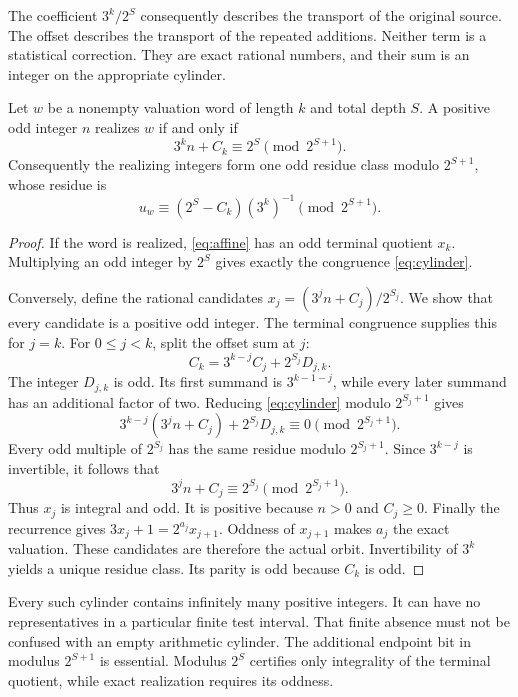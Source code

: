 The coefficient $3^k/2^S$ consequently describes the transport of the original source. The offset describes the transport of the repeated additions. Neither term is a statistical correction. They are exact rational numbers, and their sum is an integer on the appropriate cylinder.

\begin{theorem}\label{thm:cylinder}
Let $w$ be a nonempty valuation word of length $k$ and total depth $S$. A positive odd integer $n$ realizes $w$ if and only if
\begin{equation}\label{eq:cylinder}
3^k n+C_k\equiv 2^S\pmod{2^{S+1}}.
\end{equation}
Consequently the realizing integers form one odd residue class modulo $2^{S+1}$, whose residue is
\begin{equation}\label{eq:address}
u_w\equiv(2^S-C_k)(3^k)^{-1}\pmod{2^{S+1}}.
\end{equation}
\end{theorem}
\begin{proof}
If the word is realized, \eqref{eq:affine} has an odd terminal quotient $x_k$. Multiplying an odd integer by $2^S$ gives exactly the congruence \eqref{eq:cylinder}.

Conversely, define the rational candidates $x_j=(3^j n+C_j)/2^{S_j}$. We show that every candidate is a positive odd integer. The terminal congruence supplies this for $j=k$. For $0\le j<k$, split the offset sum at $j$:
\[
C_k=3^{k-j}C_j+2^{S_j}D_{j,k}.
\]
The integer $D_{j,k}$ is odd. Its first summand is $3^{k-1-j}$, while every later summand has an additional factor of two. Reducing \eqref{eq:cylinder} modulo $2^{S_j+1}$ gives
\[
3^{k-j}(3^j n+C_j)+2^{S_j}D_{j,k}\equiv0\pmod{2^{S_j+1}}.
\]
Every odd multiple of $2^{S_j}$ has the same residue modulo $2^{S_j+1}$. Since $3^{k-j}$ is invertible, it follows that
\[
3^j n+C_j\equiv2^{S_j}\pmod{2^{S_j+1}}.
\]
Thus $x_j$ is integral and odd. It is positive because $n>0$ and $C_j\ge0$. Finally the recurrence gives $3x_j+1=2^{a_j}x_{j+1}$. Oddness of $x_{j+1}$ makes $a_j$ the exact valuation. These candidates are therefore the actual orbit. Invertibility of $3^k$ yields a unique residue class. Its parity is odd because $C_k$ is odd.
\end{proof}

Every such cylinder contains infinitely many positive integers. It can have no representatives in a particular finite test interval. That finite absence must not be confused with an empty arithmetic cylinder. The additional endpoint bit in modulus $2^{S+1}$ is essential. Modulus $2^S$ certifies only integrality of the terminal quotient, while exact realization requires its oddness.

